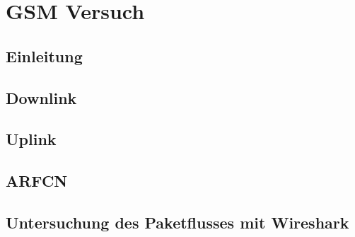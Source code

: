 
\chapter{GSM Versuch}
\section{Einleitung}

\section{Downlink}

\section{Uplink}

\section{ARFCN}


\section{Untersuchung des Paketflusses mit Wireshark}

